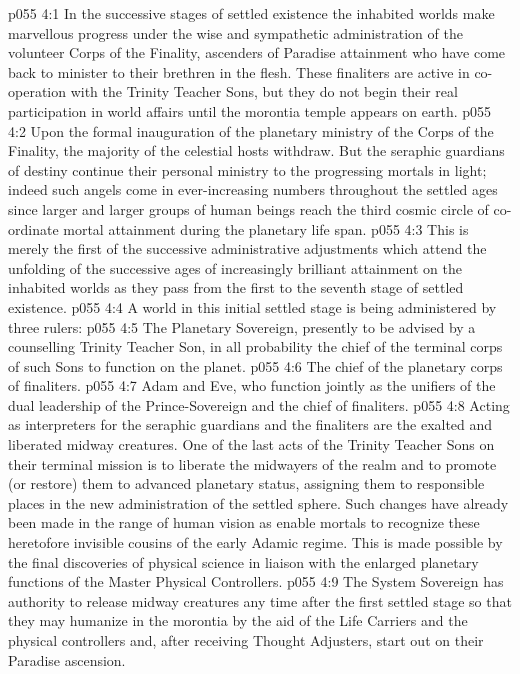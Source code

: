 \vs p055 4:1 In the successive stages of settled existence the inhabited worlds make marvellous progress under the wise and sympathetic administration of the volunteer Corps of the Finality, ascenders of Paradise attainment who have come back to minister to their brethren in the flesh. These finaliters are active in co\hyp{}operation with the Trinity Teacher Sons, but they do not begin their real participation in world affairs until the morontia temple appears on earth.
\vs p055 4:2 Upon the formal inauguration of the planetary ministry of the Corps of the Finality, the majority of the celestial hosts withdraw. But the seraphic guardians of destiny continue their personal ministry to the progressing mortals in light; indeed such angels come in ever\hyp{}increasing numbers throughout the settled ages since larger and larger groups of human beings reach the third cosmic circle of co\hyp{}ordinate mortal attainment during the planetary life span.
\vs p055 4:3 This is merely the first of the successive administrative adjustments which attend the unfolding of the successive ages of increasingly brilliant attainment on the inhabited worlds as they pass from the first to the seventh stage of settled existence.
\vs p055 4:4 \bibnobreakspace {} A world in this initial settled stage is being administered by three rulers:
\vs p055 4:5 \bibnobreakspace The Planetary Sovereign, presently to be advised by a counselling Trinity Teacher Son, in all probability the chief of the terminal corps of such Sons to function on the planet.
\vs p055 4:6 \bibnobreakspace The chief of the planetary corps of finaliters.
\vs p055 4:7 \bibnobreakspace Adam and Eve, who function jointly as the unifiers of the dual leadership of the Prince\hyp{}Sovereign and the chief of finaliters.
\vs p055 4:8 \pc Acting as interpreters for the seraphic guardians and the finaliters are the exalted and liberated midway creatures. One of the last acts of the Trinity Teacher Sons on their terminal mission is to liberate the midwayers of the realm and to promote (or restore) them to advanced planetary status, assigning them to responsible places in the new administration of the settled sphere. Such changes have already been made in the range of human vision as enable mortals to recognize these heretofore invisible cousins of the early Adamic regime. This is made possible by the final discoveries of physical science in liaison with the enlarged planetary functions of the Master Physical Controllers.
\vs p055 4:9 The System Sovereign has authority to release midway creatures any time after the first settled stage so that they may humanize in the morontia by the aid of the Life Carriers and the physical controllers and, after receiving Thought Adjusters, start out on their Paradise ascension.
